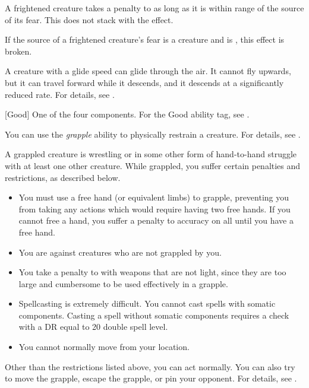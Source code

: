  A frightened creature takes a  penalty to  as long as it is within \rngmed range of the source of its fear.
This does not stack with the  effect.

If the source of a frightened creature's fear is a creature and is , this effect is broken.

 A creature with a glide speed can glide through the air.
It cannot fly upwards, but it can travel forward while it descends, and it descends at a significantly reduced rate.
For details, see .

[Good] One of the four  components. For the Good ability tag, see .

 You can use the \textit{grapple} ability to physically restrain a creature.
For details, see .

 A grappled creature is wrestling or in some other form of hand-to-hand struggle with at least one other creature.
While grappled, you suffer certain penalties and restrictions, as described below.
\begin{itemize}
    \item You must use a free hand (or equivalent limbs) to grapple, preventing you from taking any actions which would require having two free hands.
        If you cannot free a hand, you suffer a  penalty to accuracy on all  until you have a free hand.
    \item You are  against creatures who are not grappled by you.
    \item You take a  penalty to  with weapons that are not light, since they are too large and cumbersome to be used effectively in a grapple.
    \item Spellcasting is extremely difficult. You cannot cast spells with somatic components.
        Casting a spell without somatic components requires a  check with a DR equal to 20 \add double spell level.
    \item You cannot normally move from your location. 
\end{itemize}

Other than the restrictions listed above, you can act normally. You can also try to move the grapple, escape the grapple, or pin your opponent. For details, see .

